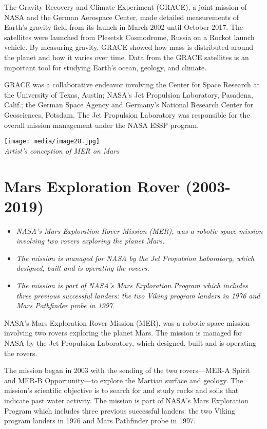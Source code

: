 The Gravity Recovery and Climate Experiment (GRACE), a joint mission of
NASA and the German Aerospace Center, made detailed measurements of
Earth's gravity field from its launch in March 2002 until October 2017.
The satellites were launched from Plesetsk Cosmodrome, Russia on a
Rockot launch vehicle. By measuring gravity, GRACE showed how mass is
distributed around the planet and how it varies over time. Data from the
GRACE satellites is an important tool for studying Earth's ocean,
geology, and climate.

GRACE was a collaborative endeavor involving the Center for Space
Research at the University of Texas, Austin; NASA's Jet Propulsion
Laboratory, Pasadena, Calif.; the German Space Agency and Germany's
National Research Center for Geosciences, Potsdam. The Jet Propulsion
Laboratory was responsible for the overall mission management under the
NASA ESSP program.

\texttt{[image: media/image28.jpg]}\\
\emph{Artist's conception of MER on Mars}

\section{Mars Exploration Rover
(2003-2019)}\label{mars-exploration-rover-2003-2019}

\begin{itemize}
\item
  \emph{NASA's Mars Exploration Rover Mission (MER), was a robotic space
  mission involving two rovers exploring the planet Mars.}
\item
  \emph{The mission is managed for NASA by the Jet Propulsion
  Laboratory, which designed, built and is operating the rovers.}
\item
  \emph{The mission is part of NASA's Mars Exploration Program which
  includes three previous successful landers: the two Viking program
  landers in 1976 and Mars Pathfinder probe in 1997.}
\end{itemize}

NASA's Mars Exploration Rover Mission (MER), was a robotic space mission
involving two rovers exploring the planet Mars. The mission is managed
for NASA by the Jet Propulsion Laboratory, which designed, built and is
operating the rovers.

The mission began in 2003 with the sending of the two rovers---MER-A
Spirit and MER-B Opportunity---to explore the Martian surface and
geology. The mission's scientific objective is to search for and study
rocks and soils that indicate past water activity. The mission is part
of NASA's Mars Exploration Program which includes three previous
successful landers: the two Viking program landers in 1976 and Mars
Pathfinder probe in 1997.

